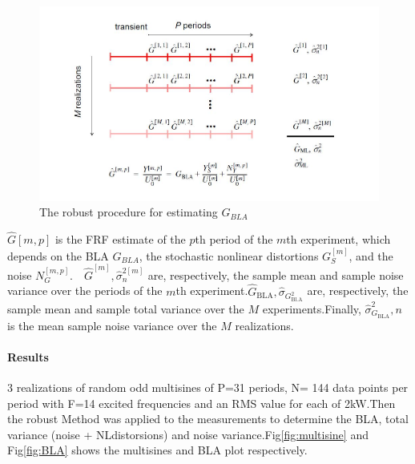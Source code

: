 \documentclass[a4paper,12pt]{article}
\numberwithin{equation}{section}
\begin{document}
\begin{figure}[H]
    \includegraphics[scale=0.9]{robust_procedure.JPG}
    \centering
    \caption{The robust procedure for estimating $G_{BLA}$}
    \label{fig:robust procedure}
\end{figure}

\noindent

$\hat{G}[m, p]$ is the FRF estimate of the $p$th period of the $m$th experiment, which depends on the BLA $G_{BLA}$, the stochastic nonlinear distortions $G_{S}^{[m]}$, and the noise $N_{G}^{[m, p]}$.$ \quad \hat{G}^{[m]}, \hat{\sigma}_{n}^{2[m]}$ are, respectively, the sample mean and sample noise variance over the periods of the $m$th   experiment.$\hat{G}_{\mathrm{BLA}},\hat{\sigma}_{G_{\mathrm{Bl.A}}^{2}}$ are, respectively, the sample mean and sample total variance over the $M$ experiments.Finally, $\hat{\sigma}_{G_{\mathrm{BLA}}}^{2}, n$ is the mean sample noise variance over the $M$ realizations.

\paragraph{Results}

3 realizations of random odd multisines of P=31 periods, N= 144 data points per period with F=14 excited frequencies and an RMS value for each of 2kW.Then the robust Method was applied to the measurements to determine the BLA, total variance (noise + NLdistorsions) and noise variance.Fig\ref{fig:multisine} and Fig\ref{fig:BLA} shows the multisines and BLA plot respectively.
\end{document}
